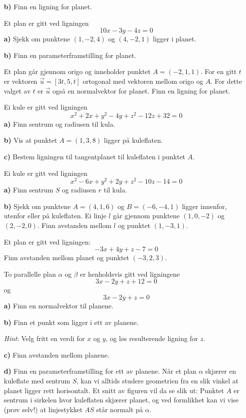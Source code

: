 \textbf{b)} Finn en ligning for planet.

Et plan er gitt ved ligningen
\[ 10x-3y-4z=0 \]
\textbf{a)} Sjekk om punktene $ (1, -2, 4) $ og $ (4, -2, 1) $ ligger i planet.\os

\textbf{b)} Finn en parameterframstilling for planet.

Et plan går gjennom origo og inneholder punktet $ A=(-2, 1, 1) $. For en gitt $ t $ er vektoren $ \vec{u}=[3t, 5, t] $ ortogonal med vektoren mellom origo og $ A $. For dette valget av $ t $ er $ \vec{u} $ også en normalvektor for planet. Finn en ligning for planet.

Ei kule er gitt ved ligningen
\[ x^2 + 2 x + y^2 - 4 y + z^2 - 12 z + 32 = 0  \]
\textbf{a)} Finn sentrum og radiusen til kula.\os

\textbf{b)} Vis at punktet $ A=(1, 3, 8) $ ligger på kuleflaten.\os

\textbf{c)} Bestem ligningen til tangentplanet til kuleflaten i punktet $ A $. 

Ei kule er gitt ved ligningen 
\[ x^2 - 6x + y^2 + 2y + z^2 - 10z-14=0 \]
\textbf{a)} Finn sentrum $ S $ og radiusen $ r $ til kula.\os

\textbf{b)} Sjekk om punktene $ A= (4, 1, 6) $ og $ B=(-6, -4, 1) $ ligger innenfor, utenfor eller på kuleflaten.
\newpage
\nes
{} Ei linje $ l $ går gjennom punktene $ (1, 0, -2) $ og $ (2, -2,0) $. Finn avstanden mellom $ l $ og punktet $ (1, -3, 1) $. 

Et plan er gitt ved ligningen:
\[ -3x+4y+z-7 = 0 \]
Finn avstanden mellom planet og punktet $ (-3,2,3) $.

To parallelle plan $ \alpha $ og $ \beta $ er henholdsvis gitt ved ligningene 
\[ 3x -2y +z +12 = 0 \]
og 
\[ 3x -2y +z = 0  \]
\textbf{a)} Finn en normalvektor til planene.\os

\textbf{b)} Finn et punkt som ligger i ett av planene. \os

\textsl{Hint}: Velg fritt en verdi for $ x $ og $ y $, og løs resulterende ligning for $ z $.\os

\textbf{c)} Finn avstanden mellom planene.\os

\textbf{d)} Finn en parameterframstilling for ett av planene.
\newpage
{}
Når et plan $ \alpha $ skjærer en kuleflate med sentrum $ S $, kan vi alltids studere geometrien fra en slik vinkel at planet ligger rett horisontalt. Et snitt av figuren vil da se slik ut:
Punktet $ A $ er sentrum i sirkelen hvor kuleflaten skjærer planet, og ved formlikhet kan vi vise (prøv selv!) at linjestykket $ AS $ står normalt på $ \alpha $.\os

